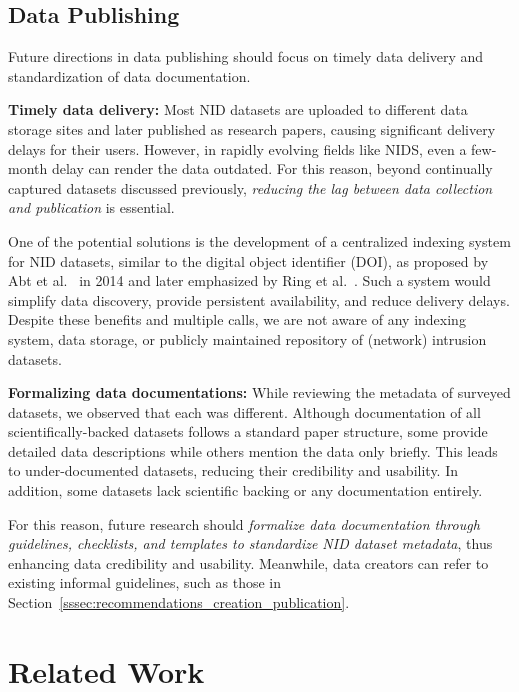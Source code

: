 \subsection{Data Publishing}

Future directions in data publishing should focus on timely data delivery and standardization of data documentation.

\textbf{Timely data delivery:} Most NID datasets are uploaded to different data storage sites and later published as research papers, causing significant delivery delays for their users. However, in rapidly evolving fields like NIDS, even a few-month delay can render the data outdated. For this reason, beyond continually captured datasets discussed previously, \emph{reducing the lag between data collection and publication} is essential.

One of the potential solutions is the development of a centralized indexing system for NID datasets, similar to the digital object identifier (DOI), as proposed by Abt et al.~\cite{abt2014_are_we_missing_labels} in 2014 and later emphasized by Ring et al.~\cite{ring2019_nids_datasets_survey}. Such a system would simplify data discovery, provide persistent availability, and reduce delivery delays. Despite these benefits and multiple calls, we are not aware of any indexing system, data storage, or publicly maintained repository of (network) intrusion datasets.

\textbf{Formalizing data documentations:} While reviewing the metadata of surveyed datasets, we observed that each was different. Although documentation of all scientifically-backed datasets follows a standard paper structure, some provide detailed data descriptions while others mention the data only briefly. This leads to under-documented datasets, reducing their credibility and usability. In addition, some datasets lack scientific backing or any documentation entirely.

For this reason, future research should \emph{formalize data documentation through guidelines, checklists, and templates to standardize NID dataset metadata}, thus enhancing data credibility and usability. Meanwhile, data creators can refer to existing informal guidelines, such as those in Section~\ref{sssec:recommendations_creation_publication}.


\section{Related Work}
\label{sec:related_work}

